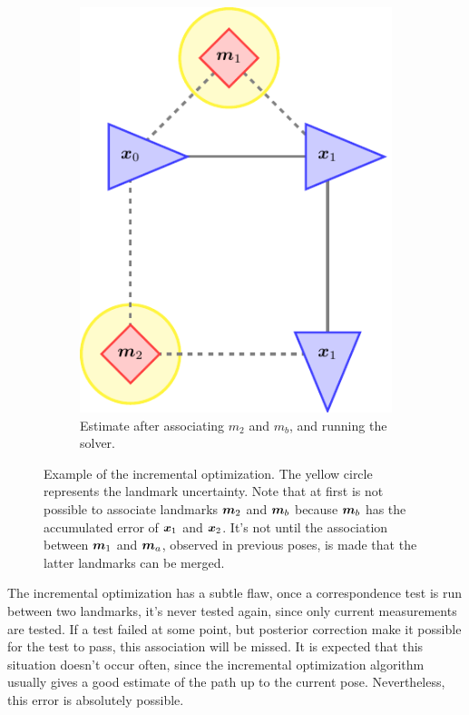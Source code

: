 \begin{figure}[htbp!]
\begin{subfigure}[htbp!]{0.25\textwidth}
        \includegraphics[width=\textwidth]{tikz/incremental3.pdf}
        \caption{Estimate after associating $m_2$ and $m_b$, and running the solver.}
    \end{subfigure}
    \caption[Example of the incremental optimization.]{Example of the incremental optimization. The yellow circle represents the landmark uncertainty. Note that at first is not possible to associate landmarks $\boldsymbol{m}_2$ and $\boldsymbol{m}_b$ because $\boldsymbol{m}_b$ has the accumulated error of $\boldsymbol{x}_1$ and $\boldsymbol{x}_2$. It's not until the association between $\boldsymbol{m}_1$ and $\boldsymbol{m}_a$, observed in previous poses, is made that the latter landmarks can be merged.}
    \label{fig:incremental}
\end{figure}    

The incremental optimization has a subtle flaw, once a correspondence test is run between two landmarks, it's never tested again, since only current measurements are tested. If a test failed at some point, but posterior correction make it possible for the test to pass, this association will be missed. It is expected that this situation doesn't occur often, since the incremental optimization algorithm usually gives a good estimate of the path up to the current pose. Nevertheless, this error is absolutely possible.


